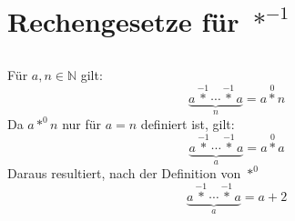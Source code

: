 \documentclass{article}
\begin{document}
\section{Rechengesetze f\"ur $\operatorname*{\ast}^{-1}$\newline}

\subsection{}
F\"ur $a, n \in \mathbb{N}$ gilt:
\[ \underbrace{a \operatorname*{\ast}^{-1} \dotsb \operatorname*{\ast}^{-1} a}_n = a\operatorname*{\ast}^0 n \]
Da $a\operatorname*{\ast}^0 n$ nur f\"ur $a=n$ definiert ist, gilt:
\[ \underbrace{a \operatorname*{\ast}^{-1} \dotsb \operatorname*{\ast}^{-1} a}_a = a\operatorname*{\ast}^0 a \]
Daraus resultiert, nach der Definition von $\operatorname*{\ast}^0$
\[ \underbrace{a \operatorname*{\ast}^{-1} \dotsb \operatorname*{\ast}^{-1} a}_a = a + 2 \]
\end{document}

